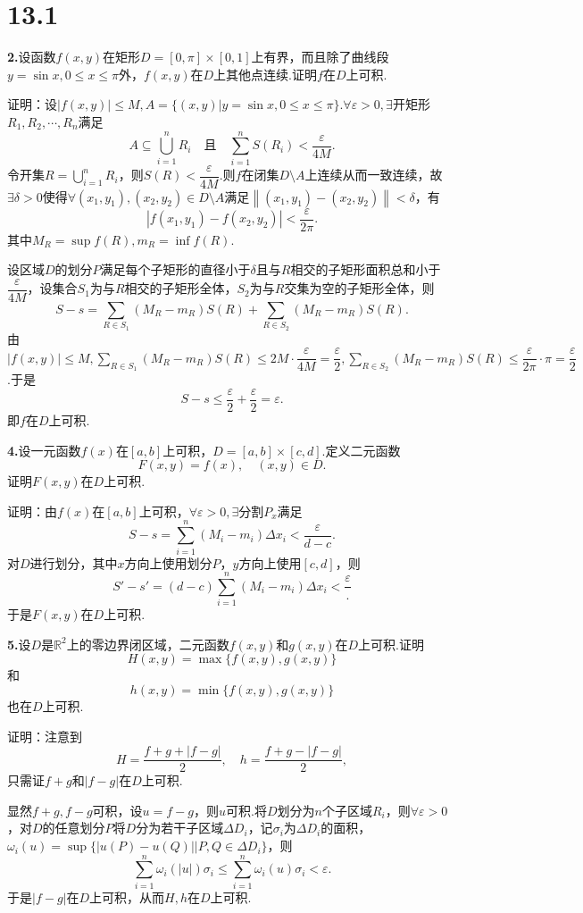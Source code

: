 \documentclass[12pt, a4paper]{article}
\newcommand{\RR}{\mathbb{R}}
\begin{document}
\section*{13.1}
\textbf{2.}设函数\(f(x, y)\)在矩形\(D = [0, \pi] \times [0, 1]\)上有界，而且除了曲线段\(y = \sin x, 0 \leq x \leq \pi\)外，\(f(x, y)\)在\(D\)上其他点连续.证明\(f\)在\(D\)上可积.

证明：设\(|f(x, y)| \leq M, A = \{(x, y)|y = \sin x, 0 \leq x \leq \pi\}\).\(\forall \varepsilon > 0, \exists\)开矩形\(R_1, R_2, \cdots, R_n\)满足
\[A \subseteq \bigcup_{i = 1}^{n} R_i \quad \text{且} \quad \sum_{i = 1}^{n} S(R_i) < \frac{\varepsilon}{4M}.\]
令开集\(R = \bigcup\limits_{i = 1}^{n} R_i\)，则\(S(R) < \dfrac{\varepsilon}{4M}\).则\(f\)在闭集\(D \setminus A\)上连续从而一致连续，故\(\exists \delta > 0\)使得\(\forall (x_1, y_1), (x_2, y_2) \in D \setminus A\)满足\(\left\|(x_1, y_1) - (x_2, y_2)\right\| < \delta\)，有
\[|f(x_1, y_1) - f(x_2, y_2)| < \frac{\varepsilon}{2\pi}.\]
其中\(M_R = \sup f(R), m_R = \inf f(R)\).

设区域\(D\)的划分\(P\)满足每个子矩形的直径小于\(\delta\)且与\(R\)相交的子矩形面积总和小于\(\dfrac{\varepsilon}{4M}\)，设集合\(S_1\)为与\(R\)相交的子矩形全体，\(S_2\)为与\(R\)交集为空的子矩形全体，则
\[S - s = \sum_{R \in S_1} (M_R - m_R) S(R) + \sum_{R \in S_2} (M_R - m_R) S(R).\]
由\(|f(x, y)| \leq M, \sum\limits_{R \in S_1} (M_R - m_R) S(R) \leq 2M \cdot \dfrac{\varepsilon}{4M} = \dfrac{\varepsilon}{2}, \sum\limits_{R \in S_2} (M_R - m_R) S(R) \leq \dfrac{\varepsilon}{2\pi} \cdot \pi = \dfrac{\varepsilon}{2}\).于是
\[S - s \leq \dfrac{\varepsilon}{2} + \dfrac{\varepsilon}{2} = \varepsilon.\]
即\(f\)在\(D\)上可积.

\textbf{4.}设一元函数\(f(x)\)在\([a, b]\)上可积，\(D = [a, b] \times [c, d]\).定义二元函数
\[F(x, y) = f(x), \quad (x, y) \in D.\]
证明\(F(x, y)\)在\(D\)上可积.

证明：由\(f(x)\)在\([a, b]\)上可积，\(\forall \varepsilon > 0, \exists\)分割\(P_x\)满足
\[S - s = \sum_{i = 1}^{n} (M_i - m_i) \Delta x_i < \frac{\varepsilon}{d - c}.\]
对\(D\)进行划分，其中\(x\)方向上使用划分\(P\)，\(y\)方向上使用\([c, d]\)，则
\[S' - s' = (d - c)\sum_{i = 1}^{n} (M_i - m_i) \Delta x_i < \frac{\varepsilon}.\]
于是\(F(x, y)\)在\(D\)上可积.

\textbf{5.}设\(D\)是\(\RR^2\)上的零边界闭区域，二元函数\(f(x, y)\)和\(g(x, y)\)在\(D\)上可积.证明
\[H(x, y) = \max\{f(x, y), g(x, y)\}\]
和
\[h(x, y) = \min\{f(x, y), g(x, y)\}\]
也在\(D\)上可积.

证明：注意到
\[H = \frac{f + g + |f - g|}{2}, \quad h = \frac{f + g - |f - g|}{2},\]
只需证\(f + g\)和\(|f - g|\)在\(D\)上可积.

显然\(f + g, f - g\)可积，设\(u = f - g\)，则\(u\)可积.将\(D\)划分为\(n\)个子区域\(R_i\)，则\(\forall \varepsilon > 0\)，对\(D\)的任意划分\(P\)将\(D\)分为若干子区域\(\Delta D_i\)，记\(\sigma_i\)为\(\Delta D_i\)的面积，\(\omega_i(u) = \sup\{|u(P) - u(Q)||P, Q \in \Delta D_i\}\)，则
\[\sum_{i = 1}^{n} \omega_i(|u|) \sigma_i \leq \sum_{i = 1}^{n} \omega_i(u) \sigma_i < \varepsilon.\]
于是\(|f - g|\)在\(D\)上可积，从而\(H, h\)在\(D\)上可积.
\end{document}

